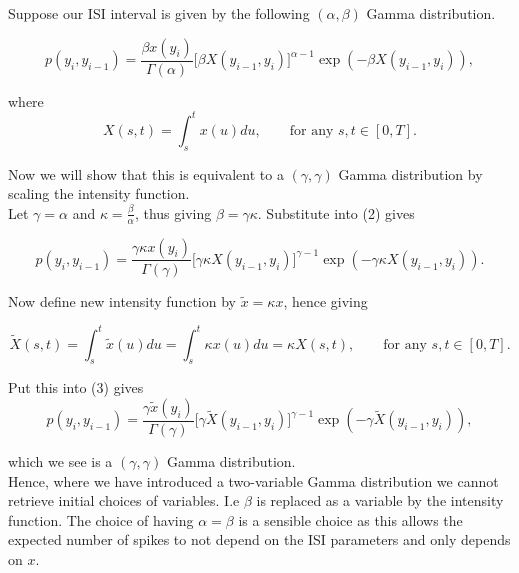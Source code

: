 \documentclass[../main.tex]{subfiles}
\begin{document}
{\color{blue}
Suppose our ISI interval is given by the following $(\alpha, \beta )$ Gamma distribution. 

\begin{equation}
 p(y_i, y_{i-1}) =  \frac{\beta x(y_i)}{\Gamma ( \alpha )} \big[ \beta X(y_{i-1} , y_i ) \big]^{\alpha -1} \exp( - \beta X(y_{i-1} , y_i )  ),
 \end{equation}
 
 where 
  \begin{equation}
X(s,t) = \int^{t}_{s} x(u) du , \qquad \text{for any } s,t \in [0,T].
\end{equation}
 
 Now we will show that this is equivalent to a $(\gamma, \gamma)$ Gamma distribution by scaling the intensity function.\\
 
 Let $\gamma = \alpha$ and $\kappa = \frac{\beta}{\alpha}$, thus giving $\beta = \gamma \kappa$. Substitute into (2) gives
 
 \begin{equation}
 p(y_i, y_{i-1}) =  \frac{\gamma \kappa x(y_i)}{\Gamma ( \gamma )} \big[ \gamma \kappa X(y_{i-1} , y_i ) \big]^{\gamma -1} \exp( - \gamma \kappa X(y_{i-1} , y_i )  ).
 \end{equation}
 
 Now define new intensity function by $\tilde x = \kappa x$, hence giving
 
   \begin{equation}
\tilde X(s,t) = \int^{t}_{s} \tilde x(u) du = \int^{t}_{s} \kappa x(u) du =  \kappa X(s,t)  , \qquad \text{for any } s,t \in [0,T].
\end{equation}

Put this into (3) gives
 \begin{equation}
 p(y_i, y_{i-1}) =  \frac{\gamma  \tilde x(y_i)}{\Gamma ( \gamma )} \big[ \gamma \tilde X(y_{i-1} , y_i ) \big]^{\gamma -1} \exp( - \gamma \tilde X(y_{i-1} , y_i )  ),
 \end{equation}
 
 which we see is a $(\gamma, \gamma)$ Gamma distribution. \\
 
 Hence, where we have introduced a two-variable Gamma distribution we cannot retrieve initial choices of variables. I.e $\beta$ is replaced as a variable by the intensity function. The choice of having $\alpha = \beta$ is a sensible choice as this allows the expected number of spikes to not depend on the ISI parameters and only depends on $x$.
 }
 
\end{document}
